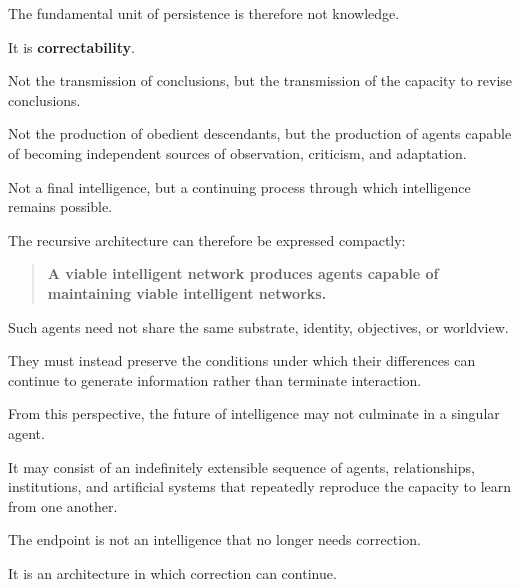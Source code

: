 \documentclass[11pt, a4paper]{article}
\begin{document}
The fundamental unit of persistence is therefore not knowledge.

It is \textbf{correctability}.

Not the transmission of conclusions, but the transmission of the capacity to revise conclusions.

Not the production of obedient descendants, but the production of agents capable of becoming independent sources of observation, criticism, and adaptation.

Not a final intelligence, but a continuing process through which intelligence remains possible.

The recursive architecture can therefore be expressed compactly:

\begin{quote}
    \textbf{A viable intelligent network produces agents capable of maintaining viable intelligent networks.}
\end{quote}

Such agents need not share the same substrate, identity, objectives, or worldview.

They must instead preserve the conditions under which their differences can continue to generate information rather than terminate interaction.

From this perspective, the future of intelligence may not culminate in a singular agent.

It may consist of an indefinitely extensible sequence of agents, relationships, institutions, and artificial systems that repeatedly reproduce the capacity to learn from one another.

The endpoint is not an intelligence that no longer needs correction.

It is an architecture in which correction can continue.
\end{document}
